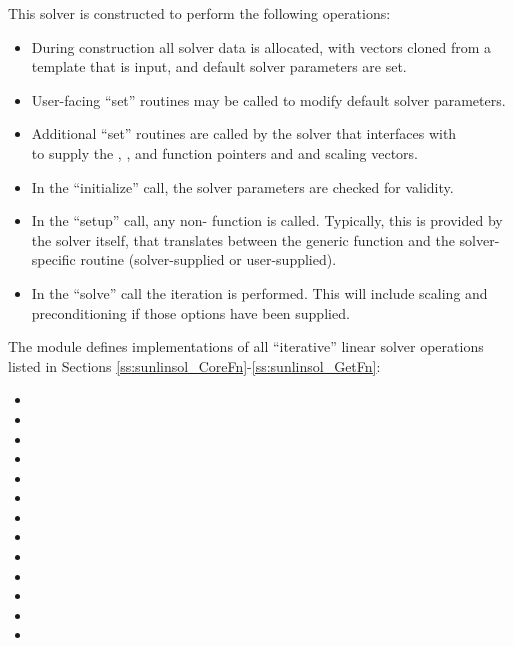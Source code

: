 This solver is constructed to perform the following operations:
\begin{itemize}
\item During construction all {\nvector} solver data is allocated,
  with vectors cloned from a template {\nvector} that is input, and
  default solver parameters are set.
\item User-facing ``set'' routines may be called to modify default
  solver parameters.
\item Additional ``set'' routines are called by the {\sundials} solver
  that interfaces with \\ \noindent {\sunlinsolspbcgs} to supply the
  , , and  function pointers and
   and  scaling vectors.
\item In the ``initialize'' call, the solver parameters are checked
  for validity.
\item In the ``setup'' call, any non-
   function is called.  Typically, this is provided by
  the {\sundials} solver itself, that translates between the
  generic  function and the
  solver-specific routine (solver-supplied or user-supplied).
\item In the ``solve'' call the {\spbcg} iteration is performed.  This
  will include scaling and preconditioning if those options have been
  supplied.
\end{itemize}


\noindent The {\sunlinsolspbcgs} module defines implementations of all
``iterative'' linear solver operations listed in Sections
\ref{ss:sunlinsol_CoreFn}-\ref{ss:sunlinsol_GetFn}:
\begin{itemize}
\item {}
\item {}
\item {}
\item {}
\item {}
\item {}
\item {}
\item {}
\item {}
\item {}
\item {}
\item {}
\item {}
\end{itemize}
